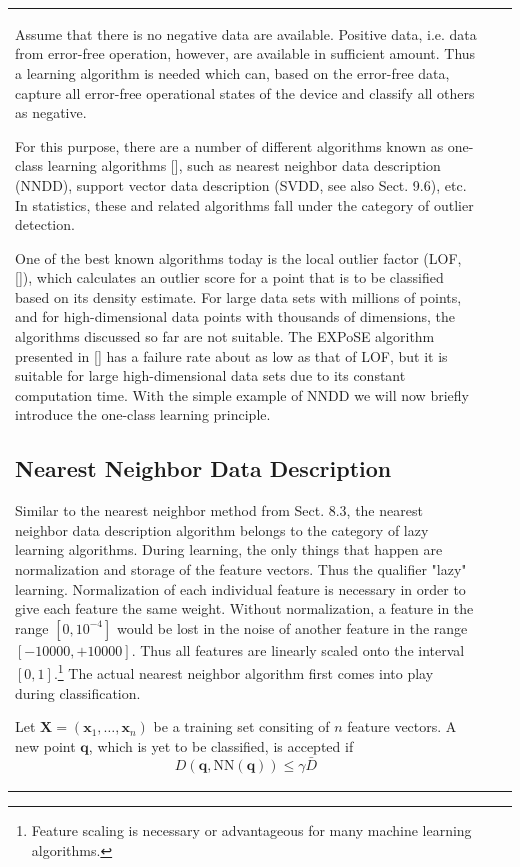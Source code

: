 \documentclass[10pt]{book}
\begin{document}
\begin{center}
\begin{tabular}{|l|l|l|}
Assume that there is no negative data are available. Positive data, i.e. data from error-free operation, however, are available in sufficient amount. Thus a learning algorithm is needed which can, based on the error-free data, capture all error-free operational states of the device and classify all others as negative.

For this purpose, there are a number of different algorithms known as one-class learning algorithms [\cite{tax01}], such as nearest neighbor data description (NNDD), support vector data description (SVDD, see also Sect. 9.6), etc. In statistics, these and related algorithms fall under the category of outlier detection.

One of the best known algorithms today is the local outlier factor (LOF, [\cite{bkns00}]), which calculates an outlier score for a point that is to be classified based on its density estimate. For large data sets with millions of points, and for high-dimensional data points with thousands of dimensions, the algorithms discussed so far are not suitable. The EXPoSE algorithm presented in [\cite{sep16}] has a failure rate about as low as that of LOF, but it is suitable for large high-dimensional data sets due to its constant computation time. With the simple example of NNDD we will now briefly introduce the one-class learning principle.

\subsection{Nearest Neighbor Data Description}
Similar to the nearest neighbor method from Sect. 8.3, the nearest neighbor data description algorithm belongs to the category of lazy learning algorithms. During learning, the only things that happen are normalization and storage of the feature vectors. Thus the qualifier "lazy" learning. Normalization of each individual feature is necessary in order to give each feature the same weight. Without normalization, a feature in the range $\left[0,10^{-4}\right]$ would be lost in the noise of another feature in the range $[-10000,+10000]$. Thus all features are linearly scaled onto the interval $[0,1]$.\footnote{Feature scaling is necessary or advantageous for many machine learning algorithms.} The actual nearest neighbor algorithm first comes into play during classification.

Let $\boldsymbol{X}=\left(\boldsymbol{x}_{1}, \ldots, \boldsymbol{x}_{n}\right)$ be a training set consiting of $n$ feature vectors. A new point $\boldsymbol{q}$, which is yet to be classified, is accepted if
\begin{equation*}
D(\boldsymbol{q}, \mathrm{NN}(\boldsymbol{q})) \leq \gamma \bar{D} \tag{8.11}
\end{equation*}


\end{tabular}
\end{center}
\end{document}

